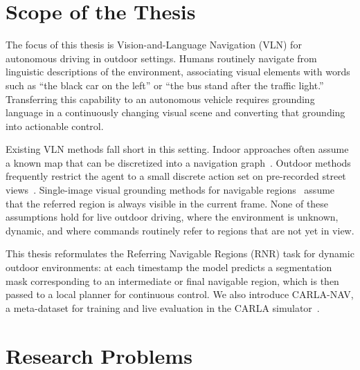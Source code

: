 \section{Scope of the Thesis}

The focus of this thesis is Vision-and-Language Navigation (VLN) for autonomous driving in outdoor settings. Humans routinely navigate from linguistic descriptions of the environment, associating visual elements with words such as ``the black car on the left'' or ``the bus stand after the traffic light.'' Transferring this capability to an autonomous vehicle requires grounding language in a continuously changing visual scene and converting that grounding into actionable control.

Existing VLN methods fall short in this setting. Indoor approaches often assume a known map that can be discretized into a navigation graph~\cite{anderson2018vision,krantz2020beyond}. Outdoor methods frequently restrict the agent to a small discrete action set on pre-recorded street views~\cite{Chen2019TOUCHDOWN,schumann-riezler-2022-analyzing}. Single-image visual grounding methods for navigable regions~\cite{Rufus_2021} assume that the referred region is always visible in the current frame. None of these assumptions hold for live outdoor driving, where the environment is unknown, dynamic, and where commands routinely refer to regions that are not yet in view.

This thesis reformulates the Referring Navigable Regions (RNR) task for dynamic outdoor environments: at each timestamp the model predicts a segmentation mask corresponding to an intermediate or final navigable region, which is then passed to a local planner for continuous control. We also introduce CARLA-NAV, a meta-dataset for training and live evaluation in the CARLA simulator~\cite{dosovitskiy2017carla}.

\section{Research Problems}

